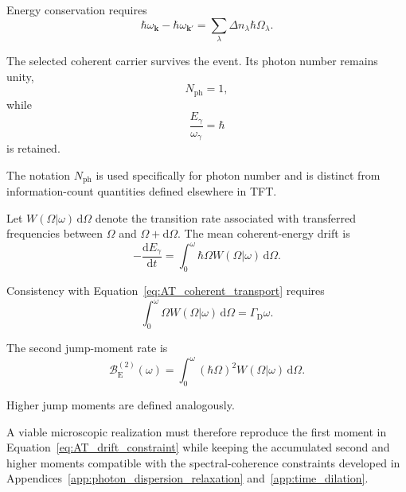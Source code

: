 Energy conservation requires
\begin{equation}
    \hbar\omega_{\mathbf k}
    -
    \hbar\omega_{\mathbf k'}
    =
    \sum_\lambda
    \Delta n_\lambda
    \hbar\Omega_\lambda.
    \label{eq:AT_quantized_energy}
\end{equation}

The selected coherent carrier survives the event. Its photon number remains
unity,
\begin{equation}
    N_{\mathrm{ph}}
    =
    1,
\end{equation}
while
\begin{equation}
    \frac{E_\gamma}{\omega_\gamma}
    =
    \hbar
\end{equation}
is retained.

The notation
\(N_{\mathrm{ph}}\)
is used specifically for photon number and is distinct from information-count
quantities defined elsewhere in TFT.

Let
\(W(\Omega|\omega)\,\mathrm d\Omega\)
denote the transition rate associated with transferred frequencies between
\(\Omega\)
and
\(\Omega+\mathrm d\Omega\).
The mean coherent-energy drift is
\begin{equation}
    -\frac{\mathrm dE_\gamma}{\mathrm dt}
    =
    \int_0^\omega
    \hbar\Omega
    W(\Omega|\omega)
    \,\mathrm d\Omega.
    \label{eq:AT_first_jump_moment}
\end{equation}

Consistency with
Equation~\eqref{eq:AT_coherent_transport}
requires
\begin{equation}
    \int_0^\omega
    \Omega
    W(\Omega|\omega)
    \,\mathrm d\Omega
    =
    \Gamma_{\mathrm D}\omega.
    \label{eq:AT_drift_constraint}
\end{equation}

The second jump-moment rate is
\begin{equation}
    \mathcal B_{\mathrm E}^{(2)}(\omega)
    =
    \int_0^\omega
    (\hbar\Omega)^2
    W(\Omega|\omega)
    \,\mathrm d\Omega.
    \label{eq:AT_second_jump_moment}
\end{equation}

Higher jump moments are defined analogously.

A viable microscopic realization must therefore reproduce the first moment
in
Equation~\eqref{eq:AT_drift_constraint}
while keeping the accumulated second and higher moments compatible with the
spectral-coherence constraints developed in
Appendices~\ref{app:photon_dispersion_relaxation}
and~\ref{app:time_dilation}.

